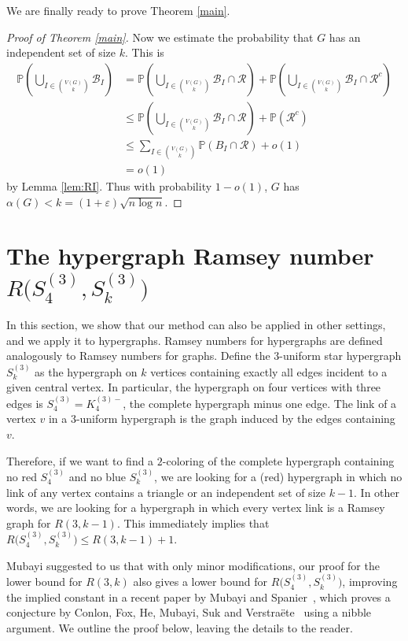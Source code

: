\documentclass{article}
\newcommand{\p}{\mathbb{P}}
\begin{document}
We are finally ready to prove Theorem \ref{main}.

\begin{proof}[Proof of Theorem \ref{main}]
Now we estimate the probability that $G$ has an independent set of size $k$.  This is
\begin{align*} 
\p \left( \bigcup_{I \in {V(G)\choose k}} \mathcal{B}_I \right) &=  \p\left( \bigcup_{I \in {V(G)\choose k}} \mathcal{B}_I \cap \mathcal{R} \right) +\p\left( \bigcup_{I \in {V(G)\choose k}} \mathcal{B}_I \cap \mathcal{R}^c \right)\\
&\le \p\left( \bigcup_{I \in {V(G)\choose k}} \mathcal{B}_I \cap \mathcal{R} \right)+\p(\mathcal R^c)\\
&\le \sum_{I \in {V(G)\choose k}} \p(B_I\cap \mathcal R)+o(1)\\
&=o(1)
\end{align*} 
by Lemma \ref{lem:RI}.  Thus with probability $1-o(1)$, $G$ has $\alpha(G) < k =(1+\varepsilon)\sqrt{n \log n}.$ 
\end{proof} 



\section{The hypergraph Ramsey number $R \bigl( S_4^{(3)},S_k^{(3)}\bigr)$} \label{sec:hyper}
In this section, we show that our method can also be applied in other settings, and we apply it to hypergraphs.
Ramsey numbers for hypergraphs are defined analogously to Ramsey numbers for graphs. Define the $3$-uniform star hypergraph $S_k^{(3)}$ as the hypergraph on $k$ vertices containing exactly all edges incident to a given central vertex. In particular, the hypergraph on four vertices with three edges is $S_4^{(3)}=K_4^{(3)-}$, the complete hypergraph minus one edge. The link of a vertex $v$ in a $3$-uniform hypergraph is the graph induced by the edges containing $v$.

Therefore, if we want to find a $2$-coloring of the complete hypergraph containing no red $S_4^{(3)}$ and no blue $S_k^{(3)}$, we are looking for a (red) hypergraph in which no link of any vertex contains a triangle or an independent set of size $k-1$. In other words, we are looking for a hypergraph in which every vertex link is a Ramsey graph for $R(3,k-1)$. This immediately implies that $R\bigl(S_4^{(3)},S_k^{(3)}\bigr)\le R(3,k-1)+1$.

Mubayi suggested to us that with only minor modifications, our proof for the lower bound for $R(3,k)$ also gives a lower bound for $R\bigl(S_4^{(3)},S_k^{(3)}\bigr)$, improving the implied constant in a recent paper by Mubayi and Spanier~\cite{mubayi2025k4freetriplesystemslarge}, which proves a conjecture by Conlon, Fox, He, Mubayi, Suk and Verstra\"ete~\cite{Conlon23} using a nibble argument. We outline the proof below, leaving the details to the reader.
\end{document}
